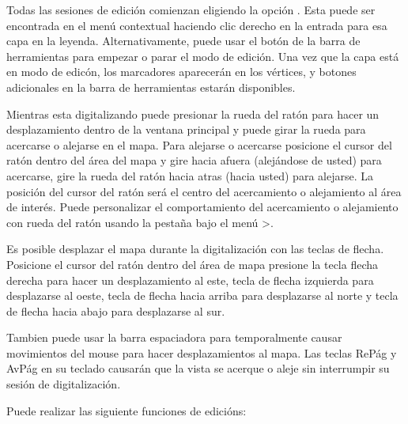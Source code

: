 Todas las sesiones de edici\'on comienzan eligiendo la opci\'on .
Esta puede ser encontrada en el men\'u contextual haciendo clic derecho en la entrada para esa capa en la leyenda.
Alternativamente, puede usar el bot\'on 
 de la barra de herramientas para empezar o parar 
el modo de edici\'on. Una vez que la capa est\'a en modo de edic\'on, 
los marcadores aparecer\'an en los v\'ertices, y botones adicionales en la barra de herramientas 
estar\'an disponibles.


Mientras esta digitalizando puede presionar la rueda del rat\'on para hacer un desplazamiento dentro de la ventana
principal y puede girar la rueda para acercarse o alejarse en el mapa. Para alejarse o acercarse
posicione el cursor del rat\'on dentro del \'area del mapa y gire hacia afuera (alej\'andose de usted) 
para acercarse, gire la rueda del rat\'on hacia atras (hacia usted) para alejarse. La posici\'on del cursor del rat\'on ser\'a el centro 
del acercamiento o alejamiento al \'area de inter\'es. Puede personalizar el comportamiento 
del acercamiento o alejamiento con rueda del rat\'on usando la pesta\~na  bajo el men\'u
 >.  


Es posible desplazar el mapa  durante la digitalizaci\'on con las teclas de flecha. Posicione
el cursor del rat\'on dentro del \'area de mapa presione la tecla flecha derecha para hacer un
desplazamiento al este, tecla de flecha izquierda para desplazarse al oeste, tecla de flecha hacia arriba para desplazarse al norte y tecla de flecha hacia abajo 
para desplazarse al sur.

Tambien puede usar la barra espaciadora para temporalmente causar movimientos del mouse para hacer desplazamientos 
al mapa. Las teclas ReP\'ag y AvP\'ag en su teclado causar\'an que la vista se acerque 
o aleje sin interrumpir su sesi\'on de digitalizaci\'on.

Puede realizar las siguiente funciones de edici\'ons:

